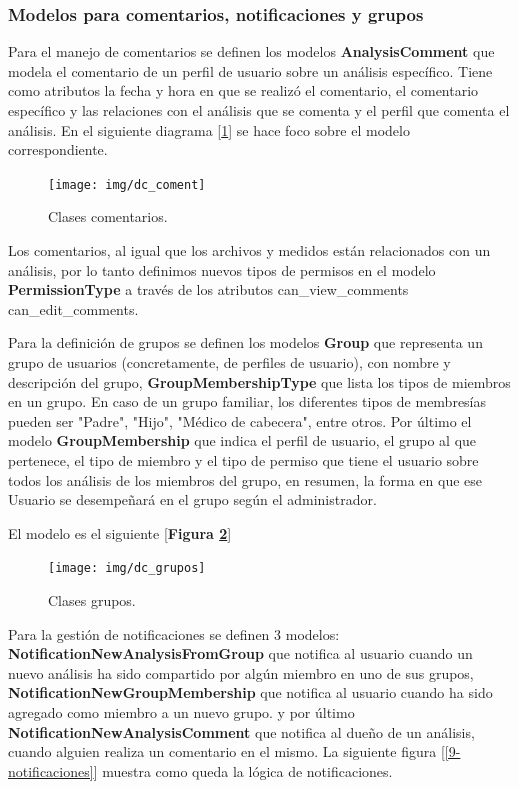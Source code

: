 \subsubsection{Modelos para comentarios, notificaciones y grupos}

Para el manejo de comentarios se definen los modelos \textbf{AnalysisComment} que modela el comentario de un perfil de usuario sobre un análisis específico. Tiene como atributos la fecha y hora en que se realizó el comentario, el comentario específico y las relaciones con el análisis que se comenta y el perfil que comenta el análisis. En el siguiente diagrama [\ref{9-comentario_análisis}] se hace foco sobre el modelo correspondiente.

	\begin{figure}[h]
        \centering
        \texttt{[image: img/dc\_coment]}
        \caption{Clases comentarios.}
		\label{9-comentario_análisis}
    \end{figure}

Los comentarios, al igual que los archivos y medidos están relacionados con un análisis, por lo tanto definimos nuevos tipos de permisos en el modelo \textbf{PermissionType} a través de los atributos can\_view\_comments can\_edit\_comments.

Para la definición de grupos se definen los modelos \textbf{Group} que representa un grupo de usuarios (concretamente, de perfiles de usuario), con nombre y descripción del grupo, \textbf{GroupMembershipType} que lista los tipos de miembros en un grupo. En caso de un grupo familiar, los diferentes tipos de membresías pueden ser "Padre", "Hijo", "Médico de cabecera", entre otros. Por último el modelo \textbf{GroupMembership} que indica el perfil de usuario, el grupo al que pertenece, el tipo de miembro y el tipo de permiso que tiene el usuario sobre todos los análisis de los miembros del grupo, en resumen, la forma en que ese Usuario se desempeñará en el grupo según el administrador. 

El modelo es el siguiente [\textbf{Figura \ref{9-grupo}}]

	\begin{figure}[h]
        \centering
        \texttt{[image: img/dc\_grupos]}
        \caption{Clases grupos.}
		\label{9-grupo}
    \end{figure}

Para la gestión de notificaciones se definen 3 modelos: \textbf{NotificationNewAnalysisFromGroup} que notifica al usuario cuando un nuevo análisis ha sido compartido por algún miembro en uno de sus grupos, \textbf{NotificationNewGroupMembership} que notifica al usuario cuando ha sido agregado como miembro a un nuevo grupo. y por último \textbf{NotificationNewAnalysisComment}  que notifica al dueño de un análisis, cuando alguien realiza un comentario en el mismo. La siguiente figura [\ref{9-notificaciones}] muestra como queda la lógica de notificaciones. 

